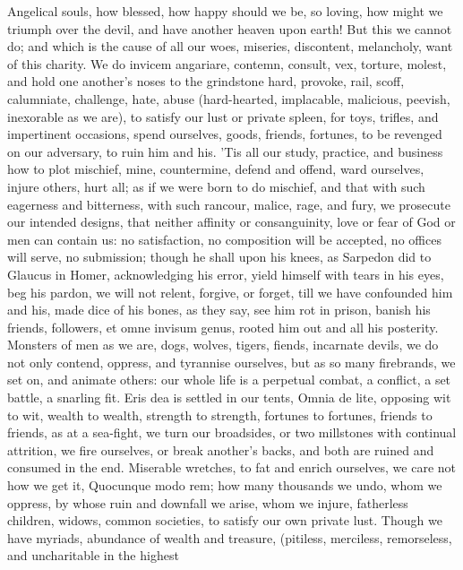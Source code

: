 {Angelical souls, how blessed, how happy should we be, so loving, how
might we triumph over the devil, and have another heaven upon earth!
But this we cannot do; and which is the cause of all our woes,
miseries, discontent, melancholy, want of this charity. We do
invicem angariare, contemn, consult, vex, torture, molest, and hold one
another's noses to the grindstone hard, provoke, rail, scoff,
calumniate, challenge, hate, abuse (hard-hearted, implacable,
malicious, peevish, inexorable as we are), to satisfy our lust or
private spleen, for toys, trifles, and impertinent occasions,
spend ourselves, goods, friends, fortunes, to be revenged on our
adversary, to ruin him and his. 'Tis all our study, practice, and
business how to plot mischief, mine, countermine, defend and offend,
ward ourselves, injure others, hurt all; as if we were born to do
mischief, and that with such eagerness and bitterness, with such
rancour, malice, rage, and fury, we prosecute our intended designs,
that neither affinity or consanguinity, love or fear of God or men can
contain us: no satisfaction, no composition will be accepted, no
offices will serve, no submission; though he shall upon his knees, as
Sarpedon did to Glaucus in Homer, acknowledging his error, yield
himself with tears in his eyes, beg his pardon, we will not relent,
forgive, or forget, till we have confounded him and his, made dice of
his bones, as they say, see him rot in prison, banish his friends,
followers, et omne invisum genus, rooted him out and all his posterity.
Monsters of men as we are, dogs, wolves, tigers, fiends,
incarnate devils, we do not only contend, oppress, and tyrannise
ourselves, but as so many firebrands, we set on, and animate others:
our whole life is a perpetual combat, a conflict, a set battle, a
snarling fit. Eris dea is settled in our tents, Omnia de lite,
opposing wit to wit, wealth to wealth, strength to strength, fortunes
to fortunes, friends to friends, as at a sea-fight, we turn our
broadsides, or two millstones with continual attrition, we fire
ourselves, or break another's backs, and both are ruined and consumed
in the end. Miserable wretches, to fat and enrich ourselves, we care
not how we get it, Quocunque modo rem; how many thousands we undo, whom
we oppress, by whose ruin and downfall we arise, whom we injure,
fatherless children, widows, common societies, to satisfy our own
private lust. Though we have myriads, abundance of wealth and treasure,
(pitiless, merciless, remorseless, and uncharitable in the highest
}
